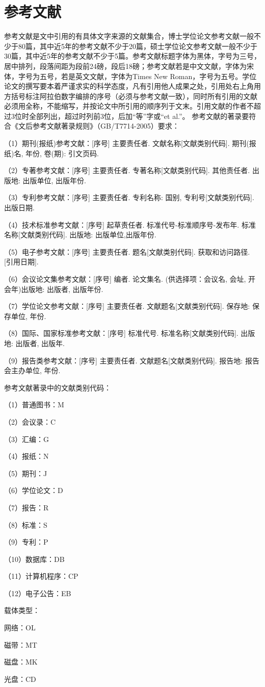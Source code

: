 \section{参考文献}
参考文献是文中引用的有具体文字来源的文献集合，博士学位论文参考文献一般不少于80篇，其中近5年的参考文献不少于20篇，硕士学位论文参考文献一般不少于30篇，其中近5年的参考文献不少于5篇。参考文献标题字体为黑体，字号为三号，居中排列，段落间距为段前24磅，段后18磅；参考文献若是中文文献，字体为宋体，字号为五号，若是英文文献，字体为Times New Roman，字号为五号。学位论文的撰写要本着严谨求实的科学态度，凡有引用他人成果之处，引用处右上角用方括号标注阿拉伯数字编排的序号（必须与参考文献一致），同时所有引用的文献必须用全称，不能缩写，并按论文中所引用的顺序列于文末。引用文献的作者不超过3位时全部列出，超过时列前3位，后加“等”字或“et al.”。 参考文献的著录要符合《文后参考文献著录规则》（GB/T7714-2005）要求：
\par
（1）期刊(报纸)参考文献：[序号] 主要责任者. 文献名称[文献类别代码]. 期刊(报纸)名, 年份, 卷(期): 引文页码.
\par
（2）专著参考文献：[序号] 主要责任者. 专著名称[文献类别代码]. 其他责任者. 出版地: 出版单位, 出版年份.
\par
（3）专利参考文献：[序号] 主要责任者. 专利名称: 国别, 专利号[文献类别代码]. 出版日期.
\par
（4）技术标准参考文献：[序号] 起草责任者. 标准代号-标准顺序号-发布年. 标准名称[文献类别代码]. 出版地: 出版单位,出版年份.
\par
（5）电子参考文献：[序号] 主要责任者. 题名[文献类别代码]. 获取和访问路径. [引用日期].
\par
（6）会议论文集参考文献：[序号] 编者. 论文集名. (供选择项：会议名, 会址, 开会年)出版地: 出版者, 出版年份.
\par
（7）学位论文参考文献：[序号]  主要责任者. 文献题名[文献类别代码]. 保存地: 保存单位, 年份.
\par
（8）国际、国家标准参考文献：[序号] 标准代号. 标准名称[文献类别代码]. 出版地: 出版者, 出版年.
\par
（9）报告类参考文献：[序号] 主要责任者. 文献题名[文献类别代码]. 报告地: 报告会主办单位, 年份.
\par
参考文献著录中的文献类别代码：
\par
（1）普通图书：M
\par
（2）会议录：C
\par
（3）汇编：G
\par
（4）报纸：N
\par
（5）期刊：J
\par
（6）学位论文：D
\par
（7）报告：R
\par
（8）标准：S
\par
（9）专利：P
\par
（10）数据库：DB
\par
（11）计算机程序：CP
\par
（12）电子公告：EB
\par
载体类型：
\par
网络：OL
\par
磁带：MT
\par
磁盘：MK
\par
光盘：CD
